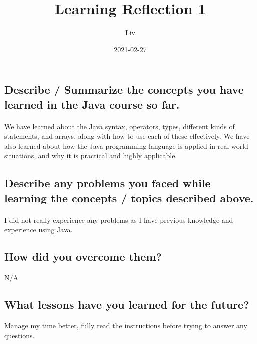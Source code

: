 \documentclass{article}
\title{Learning Reflection 1}
\date{2021-02-27}
\author{Liv}
\begin{document}
    \maketitle

    \subsection*{Describe / Summarize the concepts you have learned in the Java course so far.}
    \paragraph{}
    We have learned about the Java syntax, operators, types, different kinds of statements, and arrays, along with how to use each of these effectively.
    We have also learned about how the Java programming language is applied in real world situations, and why it is practical and highly applicable.
    
    \subsection*{Describe any problems you faced while learning the concepts / topics described above.}
    \paragraph{}
    I did not really experience any problems as I have previous knowledge and experience using Java.

    \subsection*{ How did you overcome them?}
    N/A

    \subsection*{What lessons have you learned for the future?}
    Manage my time better, fully read the instructions before trying to answer any questions.
\end{document}
